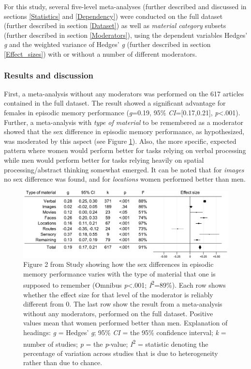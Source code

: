 For this study, several five-level meta-analyses (further described and discussed in sections \ref{Statistics} and \ref{Dependency}) were conducted on the full dataset (further described in section \ref{Dataset}) as well as \emph{material category} subsets (further described in section \ref{Moderators}), using the dependent variables Hedges' \emph{g} and the weighted variance of Hedges' \emph{g} (further described in section \ref{Effect_sizes}) with or without a number of different moderators.

\subsubsection{Results and discussion} \label{Meta_study_result} First, a meta-analysis without any moderators was performed on the 617 articles contained in the full dataset. The result showed a significant advantage for females in episodic memory performance (\emph{g}=0.19, 95\% \emph{CI}=[0.17,0.21], \emph{p}<.001). Further, a meta-analysis with \emph{type of material} to be remembered as a moderator showed that the sex difference in episodic memory performance, as hypothesized, was moderated by this aspect (see Figure \ref{Figure:Study1_TypeOfMaterial}). Also, the more specific, expected pattern where women would perform better for tasks relying on verbal processing while men would perform better for tasks relying heavily on spatial processing/abstract thinking somewhat emerged. It can be noted that for \emph{images} no sex difference was found, and for \emph{locations} women performed better than men.

\begin{figure} \centering \includegraphics[width=120mm]{./Figures/Study1_TypeOfMaterial.pdf} \caption{Figure 2 from Study  showing how the sex differences in episodic memory performance varies with the type of material that one is supposed to remember (Omnibus \emph{p}<.001; \emph{I}\textsuperscript{2}=89\%). Each row shows whether the effect size for that level of the moderator is reliably different from 0. The last row show the result from a meta-analysis without any moderators, performed on the full dataset. Positive values mean that women performed better than men. Explanation of headings: \emph{g} = Hedges' \emph{g}; 95\% \emph{CI} = the 95\% confidence interval; \emph{k} = number of studies; \emph{p} = the \emph{p}-value; \emph{I}\textsuperscript{2} = statistic denoting the percentage of variation across studies that is due to heterogeneity rather than due to chance.} \label{Figure:Study1_TypeOfMaterial} \end{figure}

